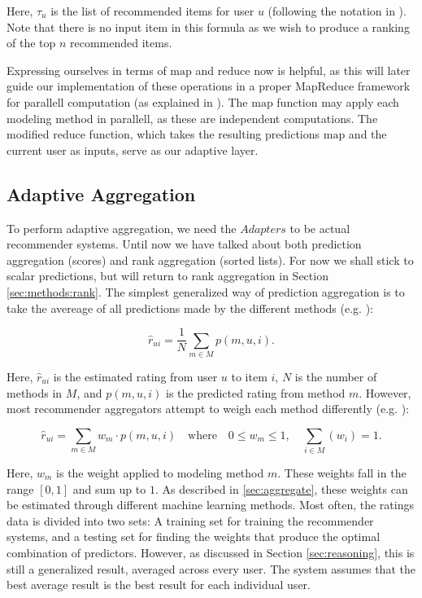 Here, $\tau_{u}$ is the list of recommended items for user $u$ (following the notation in \citet[p3]{Dwork2001}).
Note that there is no input item in this formula as we wish to produce a ranking of the top $n$ recommended items.

Expressing ourselves in terms of $\mathrm{map}$ and $\mathrm{reduce}$ now is helpful, as this will later
guide our implementation of these operations in a proper MapReduce framework
for parallell computation (as explained in \citet[p75]{Manning2008}).
The $\mathrm{map}$ function may apply each modeling method in parallell, 
as these are independent computations.
The modified $\mathrm{reduce}$ function, which takes the resulting predictions $\mathrm{map}$ and the current
user as inputs, serve as our adaptive layer.


\subsection{Adaptive Aggregation}

To perform adaptive aggregation, we need the $Adapters$ to be actual recommender systems.
Until now we have talked about both prediction aggregation (scores) and rank aggregation (sorted lists).
For now we shall stick to scalar predictions, but will return to rank aggregation in Section \ref{sec:methods:rank}.
The simplest generalized way of prediction aggregation is to take the avereage of all predictions made
by the different methods (e.g. \citet[p3]{Aslam2001}):

\begin{equation*}
  \hat{r}_{ui} = \frac{1}{N} \sum_{m \in M} p(m,u,i).
\end{equation*}

Here, $\hat{r}_{ui}$ is the estimated rating from user $u$ to item $i$,
$N$ is the number of methods in $M$, and $p(m,u,i)$ is the predicted rating from method $m$.
However, most recommender aggregators attempt to weigh each method differently (e.g. \cite{Claypool1999}):

\begin{equation*}
  \hat{r}_{ui} = \sum_{m \in M} w_{m} \cdot p(m,u,i) 
  \quad \text{where} \quad 0 \leq w_{m} \leq 1, \quad \sum_{i \in M} (w_i) = 1.
\end{equation*}

Here, $w_m$ is the weight applied to modeling method $m$. These weights fall in the range $[0,1]$ and sum up to $1$.
As described in \ref{sec:aggregate}, these weights can be estimated through different machine learning methods.
Most often, the ratings data is divided into two sets:
A training set for training the recommender systems, and a testing set for finding the weights
that produce the optimal combination of predictors.
However, as discussed in Section \ref{sec:reasoning},
this is still a generalized result, averaged across every user. 
The system assumes that the best average result is the best result for each individual user.

